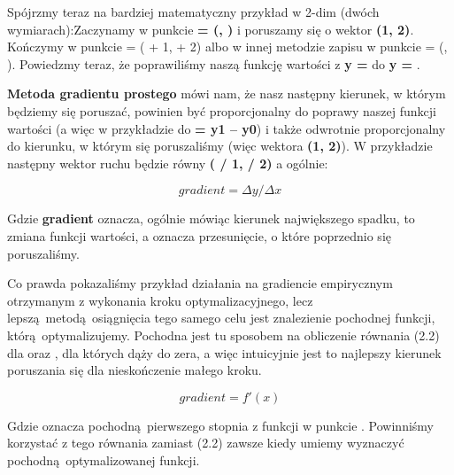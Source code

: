 \noindent Spójrzmy teraz na bardziej matematyczny przykład w 2-dim (dwóch wymiarach):\newline Zaczynamy w punkcie \textbf{ = (, )} i poruszamy się o wektor \textbf{(1, 2)}. Kończymy w punkcie  = ( + 1,  + 2) albo w innej metodzie zapisu w punkcie  = (, ). Powiedzmy teraz, że poprawiliśmy naszą funkcję wartości z \textbf{y = } do \textbf{y = }.\newline

\noindent \textbf{Metoda gradientu prostego} mówi nam, że nasz następny kierunek, w którym będziemy się poruszać, powinien być proporcjonalny do poprawy naszej funkcji wartości (a więc w przykładzie do \textbf{ = y1 – y0}) i także odwrotnie proporcjonalny do kierunku, w którym się poruszaliśmy (więc wektora \textbf{(1, 2)}). W przykładzie następny wektor ruchu będzie równy \textbf{( / 1,  / 2)} a ogólnie:

\begin{equation}
gradient = \Delta y / \Delta x
\end{equation}

\noindent Gdzie \textbf{gradient} oznacza, ogólnie mówiąc kierunek największego spadku, \textbf{} to zmiana funkcji wartości, a \textbf{} oznacza przesunięcie, o które poprzednio się poruszaliśmy.\newline

Co prawda pokazaliśmy przykład działania na gradiencie empirycznym otrzymanym z wykonania kroku optymalizacyjnego, lecz lepszą metodą osiągnięcia tego samego celu jest znalezienie pochodnej funkcji, którą optymalizujemy. Pochodna jest tu sposobem na obliczenie równania (2.2) dla \textbf{} oraz \textbf{}, dla których \textbf{} dąży do zera, a więc intuicyjnie jest to najlepszy kierunek poruszania się dla nieskończenie małego kroku.\newline

\begin{equation}
gradient = f'(x)
\end{equation}

\noindent Gdzie  oznacza pochodną pierwszego stopnia z funkcji  w punkcie . Powinniśmy korzystać z tego równania zamiast (2.2) zawsze kiedy umiemy wyznaczyć pochodną\break optymalizowanej funkcji.\newline

